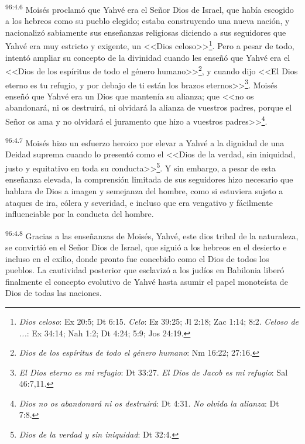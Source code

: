 \par
\textsuperscript{96:4.6} Moisés proclamó que Yahvé era el Señor Dios de Israel, que había escogido a los hebreos como su pueblo elegido; estaba construyendo una nueva nación, y nacionalizó sabiamente sus enseñanzas religiosas diciendo a sus seguidores que Yahvé era muy estricto y exigente, un <<Dios celoso>>\footnote{\textit{Dios celoso}: Ex 20:5; Dt 6:15. \textit{Celo}: Ez 39:25; Jl 2:18; Zac 1:14; 8:2. \textit{Celoso de ...}: Ex 34:14; Nah 1:2; Dt 4:24; 5:9; Jos 24:19.}. Pero a pesar de todo, intentó ampliar su concepto de la divinidad cuando les enseñó que Yahvé era el <<Dios de los espíritus de todo el género humano>>\footnote{\textit{Dios de los espíritus de todo el género humano}: Nm 16:22; 27:16.}, y cuando dijo <<El Dios eterno es tu refugio, y por debajo de ti están los brazos eternos>>\footnote{\textit{El Dios eterno es mi refugio}: Dt 33:27. \textit{El Dios de Jacob es mi refugio}: Sal 46:7,11.}. Moisés enseñó que Yahvé era un Dios que mantenía su alianza; que <<no os abandonará, ni os destruirá, ni olvidará la alianza de vuestros padres, porque el Señor os ama y no olvidará el juramento que hizo a vuestros padres>>\footnote{\textit{Dios no os abandonará ni os destruirá}: Dt 4:31. \textit{No olvida la alianza}: Dt 7:8.}.

\par
\textsuperscript{96:4.7} Moisés hizo un esfuerzo heroico por elevar a Yahvé a la dignidad de una Deidad suprema cuando lo presentó como el <<Dios de la verdad, sin iniquidad, justo y equitativo en toda su conducta>>\footnote{\textit{Dios de la verdad y sin iniquidad}: Dt 32:4.}. Y sin embargo, a pesar de esta enseñanza elevada, la comprensión limitada de sus seguidores hizo necesario que hablara de Dios a imagen y semejanza del hombre, como si estuviera sujeto a ataques de ira, cólera y severidad, e incluso que era vengativo y fácilmente influenciable por la conducta del hombre.

\par
\textsuperscript{96:4.8} Gracias a las enseñanzas de Moisés, Yahvé, este dios tribal de la naturaleza, se convirtió en el Señor Dios de Israel, que siguió a los hebreos en el desierto e incluso en el exilio, donde pronto fue concebido como el Dios de todos los pueblos. La cautividad posterior que esclavizó a los judíos en Babilonia liberó finalmente el concepto evolutivo de Yahvé hasta asumir el papel monoteísta de Dios de todas las naciones.

